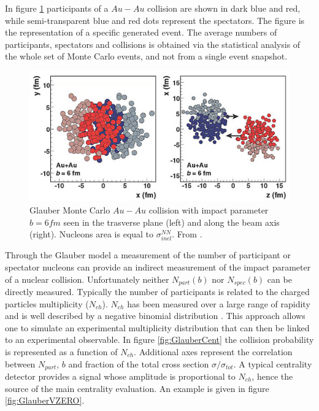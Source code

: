 In figure \ref{fig:GlauberAuAu} participants of a $Au-Au$ collision are shown in dark blue and red, while semi-transparent blue and red dots represent the spectators.
The figure is the representation of a specific generated event.
The average numbers of participants, spectators and collisions is obtained via the statistical analysis of the whole set of Monte Carlo events, and not from a single event snapshot.

\begin{figure}[!t]
\begin{center}
\includegraphics[width=0.9\linewidth]{Chapters/Analysis/Figs/glauber-pbpb.pdf}
\caption{Glauber Monte Carlo $Au-Au$ collision with impact parameter $b=6 fm$ seen in the trasverse plane (left) and along the beam axis (right). Nucleons area is equal to $\sigma_{inel}^{NN}$. From \cite{Miller:2007ri}.}
\label{fig:GlauberAuAu}
\end{center}
\end{figure}

Through the Glauber model a measurement of the number of participant or spectator nucleons can provide an indirect measurement of the impact parameter of a nuclear collision.
Unfortunately neither $N_{part}(b)$ nor $N_{spec}(b)$ can be directly measured.
Typically the number of participants is related to the charged particles multiplicity ($N_{ch}$).
$N_{ch}$ has been measured over a large range of rapidity and is well described by a negative binomial distribution \cite{Aamodt:2009aa}.
This approach allows one to simulate an experimental multiplicity distribution that can then be linked to an experimental observable.
In figure \ref{fig:GlauberCent} the collision probability is represented as a function of $N_{ch}$. Additional axes represent the correlation between $N_{part}$, $b$ and fraction of the total cross section $\sigma/\sigma_{tot}$.
A typical centrality detector provides a signal whose amplitude is proportional to $N_{ch}$, hence the source of the main centrality evaluation.
An example is given in figure \ref{fig:GlauberVZERO}.


